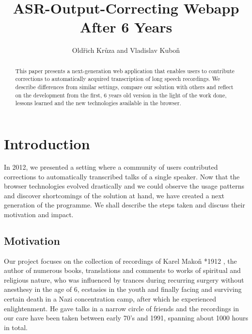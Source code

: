 \documentclass{llncs}
\begin{document}
\newtheorem{Definition}{Definition}
\title{ASR-Output-Correcting Webapp After 6 Years}

\author{Old\v{r}ich Kr\r{u}za and Vladislav Kubo\v{n}}

\maketitle

\begin{abstract}

This paper presents a next-generation web application that enables users to
contribute corrections to automatically acquired transcription of long speech
recordings. We describe differences from similar settings, compare our solution
with others and reflect on the development from the first, 6 years old version
in the light of the work done, lessons learned and the new technologies
available in the browser.

\end{abstract}

\section{Introduction}

In 2012\cite{kruuza2012making}, we presented a setting where a community of
users contributed corrections to automatically transcribed talks of a single
speaker. Now that the browser technologies evolved drastically and we could
observe the usage patterns and discover shortcomings of the solution at hand, we
have created a next generation of the programme. We shall describe the steps
taken and discuss their motivation and impact.

\subsection{Motivation}

Our project focuses on the collection of recordings of Karel Mako\v{n} *1912
, the author of numerous books, translations and comments to
works of spiritual and religious nature, who was influenced by trances during
recurring surgery without anesthesy in the age of 6, ecstasies in the youth and
finally facing and surviving certain death in a Nazi concentration camp, after
which he experienced enlightenment. He gave talks in a narrow circle of friends
and the recordings in our care have been taken between early 70's and 1991,
spanning about 1000 hours in total.
\end{document}
